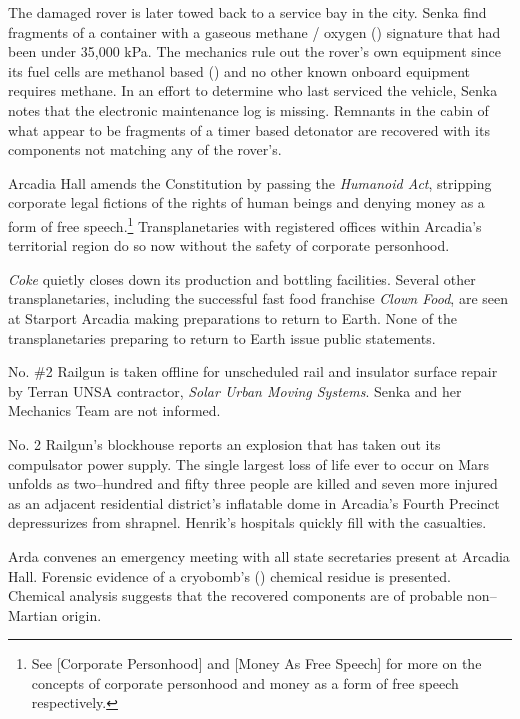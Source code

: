 The damaged rover is later towed back to a service bay in the city. Senka find fragments of a container with a gaseous methane / oxygen () signature that had been under 35,000 kPa. The mechanics rule out the rover's own equipment since its fuel cells are methanol based () and no other known onboard equipment requires methane. In an effort to determine who last serviced the vehicle, Senka notes that the electronic maintenance log is missing. Remnants in the cabin of what appear to be fragments of a timer based detonator are recovered with its components not matching any of the rover's.
\StopTimelineDate

Arcadia Hall amends the Constitution by passing the {\it Humanoid Act}, stripping corporate legal fictions of the rights of human beings and denying money as a form of free speech.\footnote{See [Corporate Personhood] and [Money As Free Speech] for more on the concepts of corporate personhood and money as a form of free speech respectively.} Transplanetaries with registered offices within Arcadia's territorial region do so now without the safety of corporate personhood.
\StopTimelineDate

{\it Coke} quietly closes down its production and bottling facilities. Several other transplanetaries, including the successful fast food franchise {\it Clown Food}, are seen at Starport Arcadia making preparations to return to Earth. None of the transplanetaries preparing to return to Earth issue public statements.
\StopTimelineDate

No. \#2 Railgun is taken offline for unscheduled rail and insulator surface repair by Terran UNSA contractor, {\it Solar Urban Moving Systems}. Senka and her Mechanics Team are not informed.
\StopTimelineDate

No. \type{#}2 Railgun's blockhouse reports an explosion that has taken out its compulsator power supply. The single largest loss of life ever to occur on Mars unfolds as two--hundred and fifty three people are killed and seven more injured as an adjacent residential district's inflatable dome in Arcadia's Fourth Precinct depressurizes from shrapnel. Henrik's hospitals quickly fill with the casualties.

Arda convenes an emergency meeting with all state secretaries present at Arcadia Hall. Forensic evidence of a cryobomb's () chemical residue is presented. Chemical analysis suggests that the recovered components are of probable non--Martian origin. 

